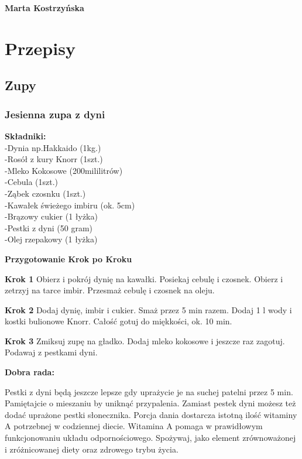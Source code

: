 \documentclass[12pt, letterpaper, titlepage]{article}
\begin{document}
\begin{flushright}
\textbf{Marta Kostrzyńska}
\end{flushright}
\newpage
\section{Przepisy}
\subsection{Zupy}
\subsubsection{Jesienna zupa z dyni}
\begin{flushleft}
\textbf{Składniki:}\\-Dynia np.Hakkaido (1kg.)\\-Rosół z kury Knorr (1szt.)\\-Mleko Kokosowe (200mililitrów)\\-Cebula (1szt.)\\-Ząbek czosnku (1szt.)\\-Kawałek świeżego imbiru (ok. 5cm)\\-Brązowy cukier (1 łyżka)\\-Pestki z dyni (50 gram)\\-Olej rzepakowy (1 łyżka)\\
\end{flushleft}
\begin{center}
\textbf{Przygotowanie Krok po Kroku}
\end{center}
\begin{flushleft}
\textbf{Krok 1}
Obierz i pokrój dynię na kawałki. Posiekaj cebulę i czosnek. Obierz i zetrzyj na tarce imbir. Przesmaż cebulę i czosnek na oleju.\\
\end{flushleft}

\begin{flushleft}
\textbf{Krok 2}
Dodaj dynię, imbir i cukier. Smaż przez 5 min razem. Dodaj 1 l wody i kostki bulionowe Knorr. Całość gotuj do miękkości, ok. 10 min.\\
\end{flushleft}

\begin{flushleft}
\textbf{Krok 3}
Zmiksuj zupę na gładko. Dodaj mleko kokosowe i jeszcze raz zagotuj. Podawaj z pestkami dyni.\\
\end{flushleft}
\begin{center}
\textbf{Dobra rada:}\\
\end{center}
Pestki z dyni będą jeszcze lepsze gdy uprażycie je na suchej patelni przez 5 min. Pamiętajcie o mieszaniu by uniknąć przypalenia. Zamiast pestek dyni możesz też dodać uprażone pestki słonecznika. Porcja dania dostarcza istotną ilość witaminy A potrzebnej w codziennej diecie. Witamina A pomaga w prawidłowym funkcjonowaniu układu odpornościowego. Spożywaj, jako element zrównoważonej i zróżnicowanej diety oraz zdrowego trybu życia.
\newpage
\end{document}

